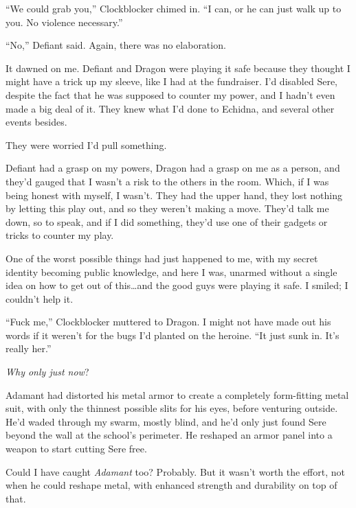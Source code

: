 ``We could grab you,'' Clockblocker chimed in.  ``I can, or he can just walk up to you.  No violence necessary.''



``No,'' Defiant said.  Again, there was no elaboration.



It dawned on me.  Defiant and Dragon were playing it safe because they thought I might have a trick up my sleeve, like I had at the fundraiser.  I'd disabled Sere, despite the fact that he was supposed to counter my power, and I hadn't even made a big deal of it.  They knew what I'd done to Echidna, and several other events besides.



They were worried I'd pull something.



Defiant had a grasp on my powers, Dragon had a grasp on me as a person, and they'd gauged that I wasn't a risk to the others in the room.  Which, if I was being honest with myself, I wasn't.  They had the upper hand, they lost nothing by letting this play out, and so they weren't making a move.  They'd talk me down, so to speak, and if I did something, they'd use one of their gadgets or tricks to counter my play.



One of the worst possible things had just happened to me, with my secret identity becoming public knowledge, and here I was, unarmed without a single idea on how to get out of this\ldots and the good guys were playing it safe.  I smiled; I couldn't help it.



``Fuck me,'' Clockblocker muttered to Dragon.  I might not have made out his words if it weren't for the bugs I'd planted on the heroine.  ``It just sunk in.  It's really her.''



\emph{Why only just now}?



Adamant had distorted his metal armor to create a completely form-fitting metal suit, with only the thinnest possible slits for his eyes, before venturing outside.  He'd waded through my swarm, mostly blind, and he'd only just found Sere beyond the wall at the school's perimeter.  He reshaped an armor panel into a weapon to start cutting Sere free.



Could I have caught \emph{Adamant } too?  Probably.  But it wasn't worth the effort, not when he could reshape metal, with enhanced strength and durability on top of that.



